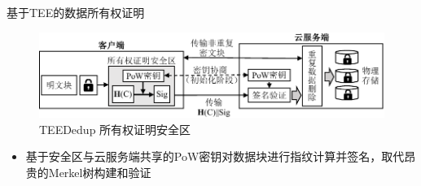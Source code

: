 \documentclass{beamer}
\newcommand{\sysnameS}{TEEDedup }
\begin{document}

\begin{frame}{基于TEE的数据所有权证明}
    \begin{figure}[!htb]
        \centering
        \includegraphics[width=\textwidth]{../pic/sgxdedup/pow.pdf}
        \caption{\sysnameS 所有权证明安全区}
        \label{fig:sgxdedup-overview-pow}
    \end{figure}
    \vspace{-1em}
    \begin{itemize}
        \item  基于安全区与云服务端共享的PoW密钥对数据块进行指纹计算并签名，取代昂贵的Merkel树构建和验证
    \end{itemize}
\end{frame}
\end{document}
